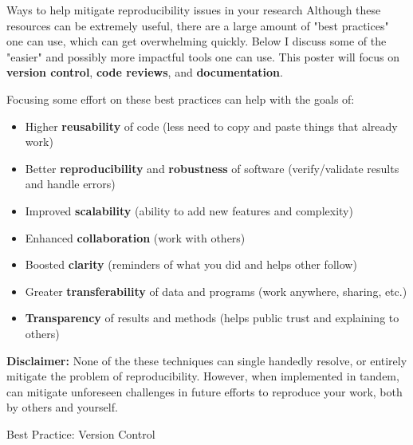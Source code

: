 \documentclass[final]{beamer}
\newlength{\colwidth}
\begin{document}
\begin{frame}[t]
\begin{columns}[t]
\begin{column}{\colwidth}
\begin{exampleblock}{Ways to help mitigate reproducibility issues in your research}
    Although these resources can be extremely useful, there are a large amount
    of "best practices" one can use, which can get overwhelming quickly.
    Below I discuss some of the "easier" and possibly more impactful tools one
    can use.
    This poster will focus on \textbf{version control}, \textbf{code reviews},
    and \textbf{documentation}.
    
    Focusing some effort on these best practices can help with the goals of:
    \begin{itemize}
      \item Higher \textbf{reusability} of code (less need to copy and paste
        things that already work)
      \item Better \textbf{reproducibility} and \textbf{robustness} of software
        (verify/validate results and handle errors)
      \item Improved \textbf{scalability} (ability to add new features and
        complexity)
      \item Enhanced \textbf{collaboration} (work with others)
      \item Boosted \textbf{clarity} (reminders of what you did and helps other
        follow)
      \item Greater \textbf{transferability} of data and programs (work
        anywhere, sharing, etc.)
      \item \textbf{Transparency} of results and methods (helps public trust
        and explaining to others)
    \end{itemize}
    
    \textbf{Disclaimer:} None of the these techniques can single handedly
    resolve, or entirely mitigate the problem of reproducibility.
    However, when implemented in tandem, can mitigate unforeseen challenges in
    future efforts to reproduce your work, both by others and yourself.

  \end{exampleblock}

  \begin{block}{Best Practice: Version Control}


\end{block}
\end{column}
\end{columns}
\end{frame}
\end{document}
